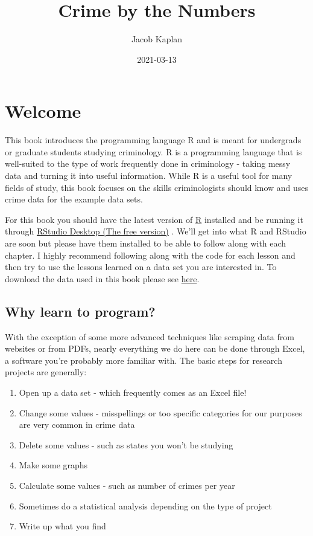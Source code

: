 \documentclass[
  12pt,
]{book}
\title{Crime by the Numbers}
\author{Jacob Kaplan}
\date{2021-03-13}
\providecommand{\tightlist}{%
  \setlength{\itemsep}{0pt}\setlength{\parskip}{0pt}}
\begin{document}
\maketitle

{
\hypersetup{linkcolor=}
\setcounter{tocdepth}{2}
\tableofcontents
}
\hypertarget{welcome}{%
\chapter*{Welcome}\label{welcome}}


This book introduces the programming language R and is meant for undergrads or graduate students studying criminology. R is a programming language that is well-suited to the type of work frequently done in criminology - taking messy data and turning it into useful information. While R is a useful tool for many fields of study, this book focuses on the skills criminologists should know and uses crime data for the example data sets.

For this book you should have the latest version of \href{https://cloud.r-project.org/}{R} installed and be running it through \href{https://www.rstudio.com/products/rstudio/download/}{RStudio Desktop (The free version)} . We'll get into what R and RStudio are soon but please have them installed to be able to follow along with each chapter. I highly recommend following along with the code for each lesson and then try to use the lessons learned on a data set you are interested in. To download the data used in this book please see \href{https://github.com/jacobkap/r4crimz/tree/master/data}{here}.

\hypertarget{why-learn-to-program}{%
\section*{Why learn to program?}\label{why-learn-to-program}}


With the exception of some more advanced techniques like scraping data from websites or from PDFs, nearly everything we do here can be done through Excel, a software you're probably more familiar with. The basic steps for research projects are generally:

\begin{enumerate}
\def\labelenumi{\arabic{enumi}.}
\tightlist
\item
  Open up a data set - which frequently comes as an Excel file!
\item
  Change some values - misspellings or too specific categories for our purposes are very common in crime data
\item
  Delete some values - such as states you won't be studying
\item
  Make some graphs
\item
  Calculate some values - such as number of crimes per year
\item
  Sometimes do a statistical analysis depending on the type of project
\item
  Write up what you find
\end{enumerate}
\end{document}
